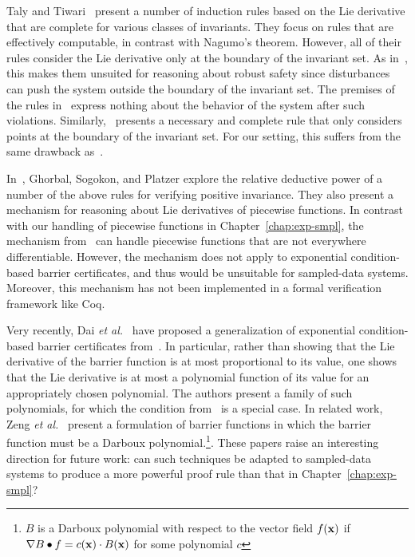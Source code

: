 Taly and Tiwari~\cite{taly2009deductive} present a number of induction
rules based on the Lie derivative that are complete for various classes of
invariants. They focus on rules that are effectively computable, in
contrast with Nagumo's theorem. However, all of their rules consider the
Lie derivative only at the boundary of the invariant set. As
in~\cite{prajna04barrier}, this makes them unsuited for reasoning about
robust safety since disturbances can push the system outside the boundary
of the invariant set. The premises of the rules in~\cite{taly2009deductive}
express nothing about the behavior of the system after such
violations. Similarly,~\cite{Liu11barrier} presents a necessary and
complete rule that only considers points at the boundary of the invariant
set. For our setting, this suffers from the same drawback
as~\cite{taly2009deductive}.

In~\cite{Ghorbal17inv}, Ghorbal, Sogokon, and Platzer explore the relative
deductive power of a number of the above rules for verifying positive
invariance. They also present a mechanism for reasoning about Lie
derivatives of piecewise functions. In contrast with our handling of
piecewise functions in Chapter~\ref{chap:exp-smpl}, the mechanism
from~\cite{Ghorbal17inv} can handle piecewise functions that are not
everywhere differentiable. However, the mechanism does not apply to
exponential condition-based barrier certificates, and thus would be
unsuitable for sampled-data systems. Moreover, this mechanism has not been
implemented in a formal verification framework like Coq.

Very recently, Dai \emph{et al.}~\cite{Dai17revisited} have proposed a
generalization of exponential condition-based barrier certificates
from~\cite{kong2013barrier}. In particular, rather than showing that the
Lie derivative of the barrier function is at most proportional to its
value, one shows that the Lie derivative is at most a polynomial function
of its value for an appropriately chosen polynomial. The authors present a
family of such polynomials, for which the condition
from~\cite{kong2013barrier} is a special case. In related work, Zeng
\emph{et al.}~\cite{Zeng16barrier} present a formulation of barrier
functions in which the barrier function must be a Darboux
polynomial.\footnote{$B$ is a Darboux polynomial with respect to the vector
  field $f(\mathbf{x})$ if $\nabla B \bullet f = c(\mathbf{x}) \cdot
  B(\mathbf{x})$ for some polynomial $c$}. These papers raise an
interesting direction for future work: can such techniques be adapted to
sampled-data systems to produce a more powerful proof rule than that in
Chapter~\ref{chap:exp-smpl}?

